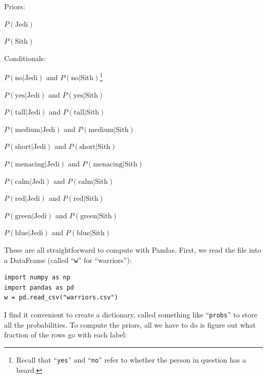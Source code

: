 \vspace{.1in}
\begin{compactitem}
\item Priors:
    \begin{compactitem}
    \item $P(\textrm{Jedi})$
    \item $P(\textrm{Sith})$
    \end{compactitem}

\item Conditionals:
    \begin{compactitem}
    \item $P(\textrm{no}|\textrm{Jedi})$ and
$P(\textrm{no}|\textrm{Sith})$\footnote{Recall that ``\texttt{yes}'' and
``\texttt{no}'' refer to whether the person in question has a beard.}
    \item $P(\textrm{yes}|\textrm{Jedi})$ and $P(\textrm{yes}|\textrm{Sith})$
    \item $P(\textrm{tall}|\textrm{Jedi})$ and $P(\textrm{tall}|\textrm{Sith})$
    \item $P(\textrm{medium}|\textrm{Jedi})$ and $P(\textrm{medium}|\textrm{Sith})$
    \item $P(\textrm{short}|\textrm{Jedi})$ and $P(\textrm{short}|\textrm{Sith})$
    \item $P(\textrm{menacing}|\textrm{Jedi})$ and $P(\textrm{menacing}|\textrm{Sith})$
    \item $P(\textrm{calm}|\textrm{Jedi})$ and $P(\textrm{calm}|\textrm{Sith})$
    \item $P(\textrm{red}|\textrm{Jedi})$ and $P(\textrm{red}|\textrm{Sith})$
    \item $P(\textrm{green}|\textrm{Jedi})$ and $P(\textrm{green}|\textrm{Sith})$
    \item $P(\textrm{blue}|\textrm{Jedi})$ and $P(\textrm{blue}|\textrm{Sith})$
    \end{compactitem}

\end{compactitem}

These are all straightforward to compute with Pandas. First, we read the file
into a DataFrame (called ``\texttt{w}'' for ``warriors''):

\begin{Verbatim}[fontsize=\small,samepage=true,frame=single]
import numpy as np
import pandas as pd
w = pd.read_csv("warriors.csv")
\end{Verbatim}

I find it convenient to create a dictionary, called something like
``\texttt{probs}'' to store all the probabilities. To compute the priors, all
we have to do is figure out what fraction of the rows go with each label:

